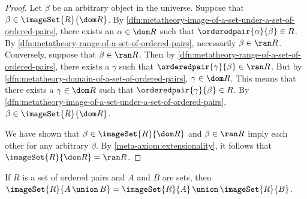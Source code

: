 \begin{proof}
    Let \( \beta \) be an arbitrary object in the universe.
    Suppose that \( \beta \in \imageSet{R}{\dom R} \).
    By \cref{dfn:metatheory-image-of-a-set-under-a-set-of-ordered-pairs}, there exists
    an \( \alpha \in \dom R \) such that \( \orderedpair{\alpha}{\beta} \in R \).
    By \cref{dfn:metatheory-range-of-a-set-of-ordered-pairs}, necessarily \( \beta \in \ran R \).
    Conversely, suppose that \( \beta \in \ran R \).
    Then by \cref{dfn:metatheory-range-of-a-set-of-ordered-pairs}, there exists a \( \gamma \) such that
    \( \orderedpair{\gamma}{\beta} \in \ran R \).
    But by \cref{dfn:metatheory-domain-of-a-set-of-ordered-pairs}, \( \gamma \in \dom R \).
    This means that there exists a \( \gamma \in \dom R \) such that \( \orderedpair{\gamma}{\beta} \in R \).
    By \cref{dfn:metatheory-image-of-a-set-under-a-set-of-ordered-pairs}, \( \beta \in \imageSet{R}{\dom R} \).

    \vspace{0.3cm}
    \noindent
    We have shown that \( \beta \in \imageSet{R}{\dom R} \) and \( \beta \in \ran R \) imply each other for any arbitrary \( \beta \).
    By \cref{meta-axiom:extensionality}, it follows that \( \imageSet{R}{\dom R} = \ran R \).
\end{proof}

\begin{thm}
     \label{thm:metatheory-image-of-union-is-union-of-images}
    If \( R \) is a set of ordered pairs and \( A \) and \( B \) are sets, then \( \imageSet{R}{A \,{\union}\, B} = \imageSet{R}{A} \,{\union}\, \imageSet{R}{B} \).
\end{thm}

